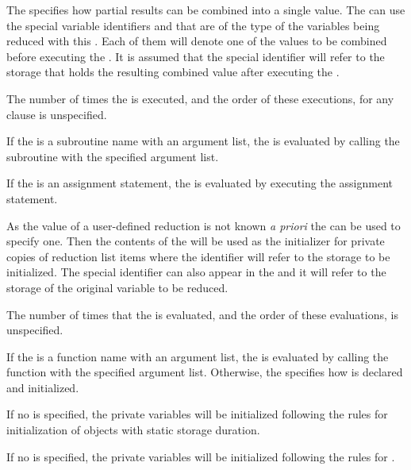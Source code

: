 The  specifies how partial results can be combined into a single value. The 
 can use the special variable identifiers  and  that are of the 
type of the variables being reduced with this . Each of them will 
denote one of the values to be combined before executing the . It is assumed 
that the special  identifier will refer to the storage that holds the resulting 
combined value after executing the .

The number of times the  is executed, and the order of these executions, for 
any  clause is unspecified.

\fortranspecificstart
If the  is a subroutine name with an argument list, the  is evaluated by 
calling the subroutine with the specified argument list.

If the  is an assignment statement, the  is evaluated by executing the 
assignment statement.
\fortranspecificend

As the  value of a user-defined reduction is not known \emph{a priori} the 
 can be used to specify one. Then the contents of the  
will be used as the initializer for private copies of reduction list items where the 
 identifier will refer to the storage to be initialized. The special identifier 
 can also appear in the  and it will refer to the storage of the 
original variable to be reduced.

The number of times that the  is evaluated, and the order of these 
evaluations, is unspecified.

\ccppspecificstart
If the  is a function name with an argument list, the  is 
evaluated by calling the function with the specified argument list. Otherwise, the 
 specifies how  is declared and initialized.
\ccppspecificend
\bigskip

\cspecificstart
If no  is specified, the private variables will be initialized following the 
rules for initialization of objects with static storage duration.
\cspecificend

\cppspecificstart
If no  is specified, the private variables will be initialized following the 
rules for .
\cppspecificend
\bigskip


